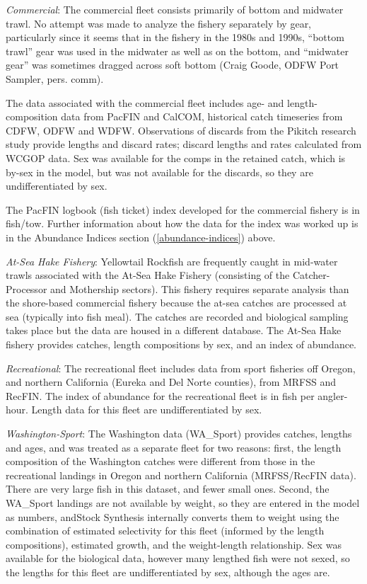 \documentclass[12pt,]{article}
\begin{document}
\emph{Commercial}: The commercial fleet consists primarily of bottom and
midwater trawl. No attempt was made to analyze the fishery separately by
gear, particularly since it seems that in the fishery in the 1980s and
1990s, ``bottom trawl'' gear was used in the midwater as well as on the
bottom, and ``midwater gear'' was sometimes dragged across soft bottom
(Craig Goode, ODFW Port Sampler, pers. comm).

The data associated with the commercial fleet includes age- and
length-composition data from PacFIN and CalCOM, historical catch
timeseries from CDFW, ODFW and WDFW. Observations of discards from the
Pikitch research study provide lengths and discard rates; discard
lengths and rates calculated from WCGOP data. Sex was available for the
comps in the retained catch, which is by-sex in the model, but was not
available for the discards, so they are undifferentiated by sex.

The PacFIN logbook (fish ticket) index developed for the commercial
fishery is in fish/tow. Further information about how the data for the
index was worked up is in the Abundance Indices section
(\ref{abundance-indices}) above.

\emph{At-Sea Hake Fishery}: Yellowtail Rockfish are frequently caught in
mid-water trawls associated with the At-Sea Hake Fishery (consisting of
the Catcher-Processor and Mothership sectors). This fishery requires
separate analysis than the shore-based commercial fishery because the
at-sea catches are processed at sea (typically into fish meal). The
catches are recorded and biological sampling takes place but the data
are housed in a different database. The At-Sea Hake fishery provides
catches, length compositions by sex, and an index of abundance.

\emph{Recreational}: The recreational fleet includes data from sport
fisheries off Oregon, and northern California (Eureka and Del Norte
counties), from MRFSS and RecFIN. The index of abundance for the
recreational fleet is in fish per angler-hour. Length data for this
fleet are undifferentiated by sex.

\emph{Washington-Sport}: The Washington data (WA\_Sport) provides
catches, lengths and ages, and was treated as a separate fleet for two
reasons: first, the length composition of the Washington catches were
different from those in the recreational landings in Oregon and northern
California (MRFSS/RecFIN data). There are very large fish in this
dataset, and fewer small ones. Second, the WA\_Sport landings are not
available by weight, so they are entered in the model as numbers,
andStock Synthesis internally converts them to weight using the
combination of estimated selectivity for this fleet (informed by the
length compositions), estimated growth, and the weight-length
relationship. Sex was available for the biological data, however many
lengthed fish were not sexed, so the lengths for this fleet are
undifferentiated by sex, although the ages are.
\end{document}
